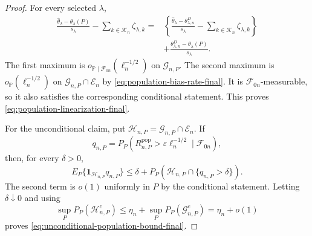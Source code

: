 \documentclass[11pt]{article}
\theoremstyle{definition}
\newcommand{\1}{\mathbf 1}\newcommand{\op}{\operatorname}
\begin{document}
\begin{proof}
For every selected $\lambda$,
\begin{equation}
\begin{split}
\frac{\widehat\theta_\lambda-\theta_\lambda(P)}{s_\lambda}
-
\sum_{k\in\mathcal K_n}\zeta_{\lambda,k}
={}&
\left\{
\frac{\widehat\theta_\lambda-\theta_{\lambda,n}^D}{s_\lambda}
-
\sum_{k\in\mathcal K_n}\zeta_{\lambda,k}
\right\}\\
&+
\frac{\theta_{\lambda,n}^D-\theta_\lambda(P)}{s_\lambda}.
\end{split}
\label{eq:population-decomposition-final}
\end{equation}
The first maximum is
$o_{\mathbb P\mid\mathcal F_{0n}}(\ell_n^{-1/2})$
on $\mathcal G_{n,P}$. The second maximum is
$o_{\mathbb P}(\ell_n^{-1/2})$ on
$\mathcal G_{n,P}\cap\mathcal E_n$ by
\eqref{eq:population-bias-rate-final}. It is
$\mathcal F_{0n}$-measurable, so it also satisfies the corresponding
conditional statement. This proves
\eqref{eq:population-linearization-final}.

For the unconditional claim, put
$\mathcal H_{n,P}=\mathcal G_{n,P}\cap\mathcal E_n$.
If
\[
q_{n,P}
=
P_P\!\left(
R_{n,P}^{\mathrm{pop}}
>
\varepsilon\ell_n^{-1/2}
\mid\mathcal F_{0n}
\right),
\]
then, for every $\delta>0$,
\[
E_P\{\mathbf 1_{\mathcal H_{n,P}}q_{n,P}\}
\le
\delta+
P_P\!\left(
\mathcal H_{n,P}\cap\{q_{n,P}>\delta\}
\right).
\]
The second term is $o(1)$ uniformly in $P$ by the conditional
statement. Letting $\delta\downarrow0$ and using
\[
\sup_P P_P(\mathcal H_{n,P}^c)
\le
\eta_n+\sup_P P_P(\mathcal G_{n,P}^c)
=
\eta_n+o(1)
\]
proves \eqref{eq:unconditional-population-bound-final}.
\end{proof}
\end{document}
